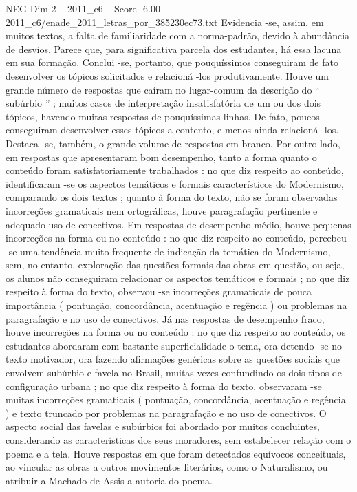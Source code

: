 \begin{textsample}{NEG Dim 2 – 2011\_c6 – Score -6.00 – 2011\_c6/enade\_2011\_letras\_por\_385230ec73.txt}
Evidencia -se, assim, em muitos textos, a falta de familiaridade com a norma-padrão, devido à abundância de desvios.
Parece que, para significativa parcela dos estudantes, há essa lacuna em sua formação.
Conclui -se, portanto, que pouquíssimos conseguiram de fato desenvolver os tópicos solicitados e relacioná -los produtivamente.
Houve um grande número de respostas que caíram no lugar-comum da descrição do “ subúrbio ” ; muitos casos de interpretação insatisfatória de um ou dos dois tópicos, havendo muitas respostas de pouquíssimas linhas.
De fato, poucos conseguiram desenvolver esses tópicos a contento, e menos ainda relacioná -los.
Destaca -se, também, o grande volume de respostas em branco.
Por outro lado, em respostas que apresentaram bom desempenho, tanto a forma quanto o conteúdo foram satisfatoriamente trabalhados : no que diz respeito ao conteúdo, identificaram -se os aspectos temáticos e formais característicos do Modernismo, comparando os dois textos ; quanto à forma do texto, não se foram observadas incorreções gramaticais nem ortográficas, houve paragrafação pertinente e adequado uso de conectivos.
Em respostas de desempenho médio, houve pequenas incorreções na forma ou no conteúdo : no que diz respeito ao conteúdo, percebeu -se uma tendência muito frequente de indicação da temática do Modernismo, sem, no entanto, exploração das questões formais das obras em questão, ou seja, os alunos não conseguiram relacionar os aspectos temáticos e formais ; no que diz respeito à forma do texto, observou -se incorreções gramaticais de pouca importância ( pontuação, concordância, acentuação e regência ) ou problemas na paragrafação e no uso de conectivos.
Já nas respostas de desempenho fraco, houve incorreções na forma ou no conteúdo : no que diz respeito ao conteúdo, os estudantes abordaram com bastante superficialidade o tema, ora detendo -se no texto motivador, ora fazendo afirmações genéricas sobre as questões sociais que envolvem subúrbio e favela no Brasil, muitas vezes confundindo os dois tipos de configuração urbana ; no que diz respeito à forma do texto, observaram -se muitas incorreções gramaticais ( pontuação, concordância, acentuação e regência ) e texto truncado por problemas na paragrafação e no uso de conectivos.
O aspecto social das favelas e subúrbios foi abordado por muitos concluintes, considerando as características dos seus moradores, sem estabelecer relação com o poema e a tela.
Houve respostas em que foram detectados equívocos conceituais, ao vincular as obras a outros movimentos literários, como o Naturalismo, ou atribuir a Machado de Assis a autoria do poema.

\end{textsample}
